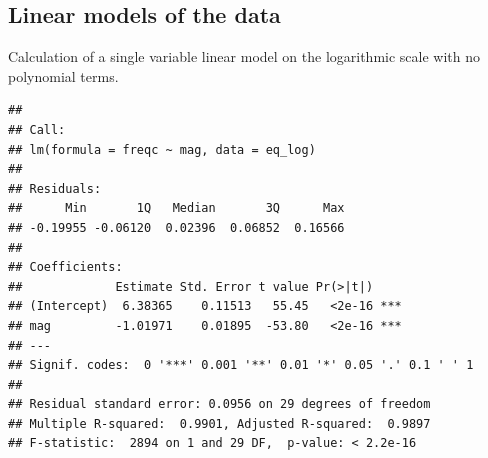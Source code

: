 \hypertarget{linear-models-of-the-data}{%
\subsection{Linear models of the data}\label{linear-models-of-the-data}}

Calculation of a single variable linear model on the logarithmic scale
with no polynomial terms.

\begin{Shaded}
\begin{Highlighting}[]
\OtherTok{\textless{}{-}} \NormalTok{(}\SpecialCharTok{\textasciitilde{}}


\end{Highlighting}
\end{Shaded}

\begin{verbatim}
## 
## Call:
## lm(formula = freqc ~ mag, data = eq_log)
## 
## Residuals:
##      Min       1Q   Median       3Q      Max 
## -0.19955 -0.06120  0.02396  0.06852  0.16566 
## 
## Coefficients:
##             Estimate Std. Error t value Pr(>|t|)    
## (Intercept)  6.38365    0.11513   55.45   <2e-16 ***
## mag         -1.01971    0.01895  -53.80   <2e-16 ***
## ---
## Signif. codes:  0 '***' 0.001 '**' 0.01 '*' 0.05 '.' 0.1 ' ' 1
## 
## Residual standard error: 0.0956 on 29 degrees of freedom
## Multiple R-squared:  0.9901, Adjusted R-squared:  0.9897 
## F-statistic:  2894 on 1 and 29 DF,  p-value: < 2.2e-16
\end{verbatim}

\begin{Shaded}
\begin{Highlighting}[]
\OtherTok{\textless{}{-}}  \NormalTok{(} \NormalTok{))}
\SpecialCharTok{/}\SpecialCharTok{\^{}}
\end{Highlighting}
\end{Shaded}

